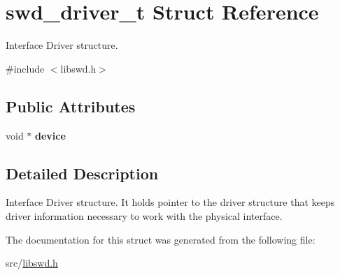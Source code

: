 \hypertarget{structswd__driver__t}{
\section{swd\_\-driver\_\-t Struct Reference}
\label{structswd__driver__t}
}


Interface Driver structure.  




{\ttfamily \#include $<$libswd.h$>$}

\subsection*{Public Attributes}
\begin{DoxyCompactItemize}
\item 
\hypertarget{structswd__driver__t_a113686dfb0aa76be1aa77c9bb02cb480}{
void $\ast$ {\bfseries device}}
\label{structswd__driver__t_a113686dfb0aa76be1aa77c9bb02cb480}

\end{DoxyCompactItemize}


\subsection{Detailed Description}
Interface Driver structure. It holds pointer to the driver structure that keeps driver information necessary to work with the physical interface. 

The documentation for this struct was generated from the following file:\begin{DoxyCompactItemize}
\item 
src/\hyperlink{libswd_8h}{libswd.h}\end{DoxyCompactItemize}
